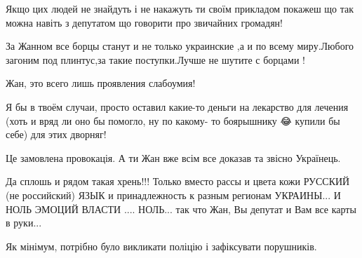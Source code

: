 \begin{itemize}
Якщо цих людей не знайдуть і не накажуть ти своїм прикладом покажеш що так
можна навіть з депутатом що говорити про звичайних громадян!

 

За Жанном все борцы станут и не только украинские ,а и по всему миру.Любого
загоним под плинтус,за такие поступки.Лучше не шутите с борцами !


 

Жан, это всего лишь проявления слабоумия!

Я бы в твоём случаи, просто оставил какие-то деньги на лекарство для лечения
(хоть и вряд ли оно бы помогло, ну по какому- то боярышнику 😂 купили бы себе)
для этих дворняг!


 

Це замовлена провокація. А ти Жан вже всім все доказав та звісно Українець.


 

Да сплошь и рядом такая хрень!!! Только вместо рассы и цвета кожи РУССКИЙ (не
российский) ЯЗЫК и принадлежность к разным регионам УКРАИНЫ... И НОЛЬ ЭМОЦИЙ
ВЛАСТИ .... НОЛЬ... так что Жан, Вы депутат и Вам все карты в руки...


 
Як мінімум, потрібно було викликати поліцію і зафіксувати порушників.


\end{itemize}
